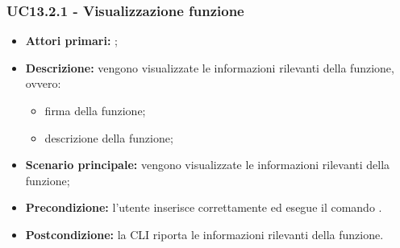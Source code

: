 \subsubsection{UC13.2.1 - Visualizzazione funzione}
\begin{itemize}
	\item \textbf{Attori primari:} \us{};
	\item \textbf{Descrizione:} vengono visualizzate le informazioni rilevanti della funzione, ovvero:
	\begin{itemize}
		\item firma della funzione;
		\item descrizione della funzione;
	\end{itemize}
	\item \textbf{Scenario principale:} vengono visualizzate le informazioni rilevanti della funzione;
	\item \textbf{Precondizione:} l'utente inserisce correttamente ed esegue il comando \plista{}.
	\item \textbf{Postcondizione:} la CLI riporta le informazioni rilevanti della funzione.
\end{itemize}